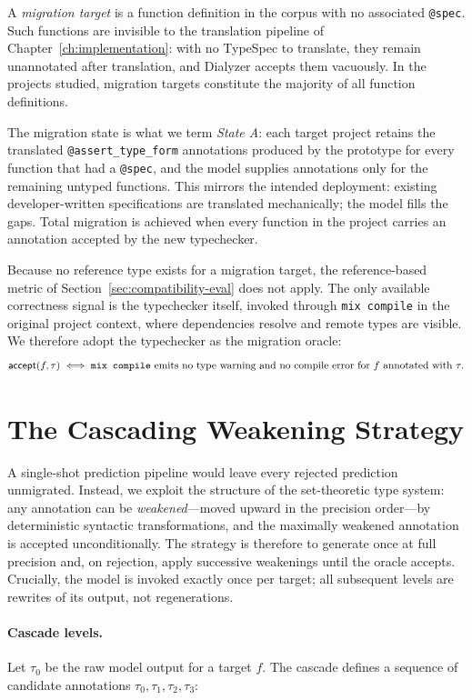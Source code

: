 A \emph{migration target} is a function definition in the corpus with no associated \texttt{@spec}.
Such functions are invisible to the translation pipeline of Chapter~\ref{ch:implementation}: with no TypeSpec to translate, they remain unannotated after translation, and Dialyzer accepts them vacuously.
In the projects studied, migration targets constitute the majority of all function definitions.

The migration state is what we term \emph{State A}: each target project retains the translated \texttt{@assert\_type\_form} annotations produced by the prototype for every function that had a \texttt{@spec}, and the model supplies annotations only for the remaining untyped functions.
This mirrors the intended deployment: existing developer-written specifications are translated mechanically; the model fills the gaps.
Total migration is achieved when every function in the project carries an annotation accepted by the new typechecker.

Because no reference type exists for a migration target, the reference-based metric of Section~\ref{sec:compatibility-eval} does not apply.
The only available correctness signal is the typechecker itself, invoked through \texttt{mix compile} in the original project context, where dependencies resolve and remote types are visible.
We therefore adopt the typechecker as the migration oracle:
\[
\mathsf{accept}(f, \tau) \iff \text{\texttt{mix compile} emits no type warning and no compile error for } f \text{ annotated with } \tau.
\]

\section{The Cascading Weakening Strategy}
\label{sec:cascade}

A single-shot prediction pipeline would leave every rejected prediction unmigrated.
Instead, we exploit the structure of the set-theoretic type system: any annotation can be \emph{weakened}---moved upward in the precision order---by deterministic syntactic transformations, and the maximally weakened annotation is accepted unconditionally.
The strategy is therefore to generate once at full precision and, on rejection, apply successive weakenings until the oracle accepts.
Crucially, the model is invoked exactly once per target; all subsequent levels are rewrites of its output, not regenerations.

\paragraph{Cascade levels.}
Let $\tau_0$ be the raw model output for a target $f$.
The cascade defines a sequence of candidate annotations $\tau_0, \tau_1, \tau_2, \tau_3$:

